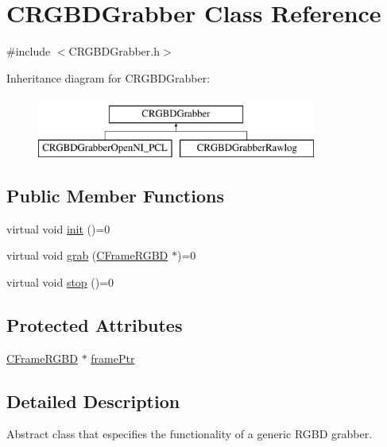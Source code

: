 \hypertarget{class_c_r_g_b_d_grabber}{
\section{CRGBDGrabber Class Reference}
\label{class_c_r_g_b_d_grabber}
}


{\ttfamily \#include $<$CRGBDGrabber.h$>$}

Inheritance diagram for CRGBDGrabber:\begin{figure}[H]
\begin{center}
\leavevmode
\includegraphics[height=2.000000cm]{class_c_r_g_b_d_grabber}
\end{center}
\end{figure}
\subsection*{Public Member Functions}
\begin{DoxyCompactItemize}
\item 
virtual void \hyperlink{class_c_r_g_b_d_grabber_ab1aa7a5c871104dd8791d5a3a5117e3a}{init} ()=0
\item 
virtual void \hyperlink{class_c_r_g_b_d_grabber_aa7f9c715a16933287a92ecaf7a1bbfb4}{grab} (\hyperlink{class_c_frame_r_g_b_d}{CFrameRGBD} $\ast$)=0
\item 
virtual void \hyperlink{class_c_r_g_b_d_grabber_a653ef16978adcd9000079f0e5f00addc}{stop} ()=0
\end{DoxyCompactItemize}
\subsection*{Protected Attributes}
\begin{DoxyCompactItemize}
\item 
\hyperlink{class_c_frame_r_g_b_d}{CFrameRGBD} $\ast$ \hyperlink{class_c_r_g_b_d_grabber_a672772dade93a640a52e129f14c6d2fa}{framePtr}
\end{DoxyCompactItemize}


\subsection{Detailed Description}
Abstract class that especifies the functionality of a generic RGBD grabber. 

